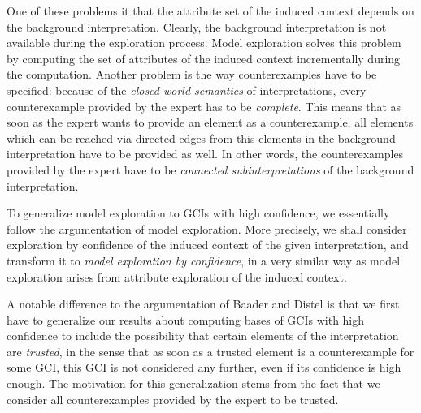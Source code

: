 One of these problems it that the attribute set of the induced context depends on the
background interpretation.  Clearly, the background interpretation is not available during
the exploration process.  Model exploration solves this problem by computing the set of
attributes of the induced context incrementally during the computation.  Another problem
is the way counterexamples have to be specified: because of the \emph{closed world
  semantics} of interpretations, every counterexample provided by the expert has to be
\emph{complete}.  This means that as soon as the expert wants to provide an element as a
counterexample, all elements which can be reached via directed edges from this elements in
the background interpretation have to be provided as well.  In other words, the
counterexamples provided by the expert have to be \emph{connected subinterpretations} of
the background interpretation.

To generalize model exploration to GCIs with high confidence, we essentially follow the
argumentation of model exploration.  More precisely, we shall consider exploration by
confidence of the induced context of the given interpretation, and transform it to
\emph{model exploration by confidence}, in a very similar way as model exploration arises
from attribute exploration of the induced context.

A notable difference to the argumentation of Baader and Distel is that we first have to
generalize our results about computing bases of GCIs with high confidence to include the
possibility that certain elements of the interpretation are \emph{trusted}, in the sense
that as soon as a trusted element is a counterexample for some GCI, this GCI is not
considered any further, even if its confidence is high enough.  The motivation for this
generalization stems from the fact that we consider all counterexamples provided by the
expert to be trusted.


